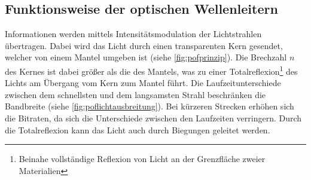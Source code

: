 \subsection{Funktionsweise der optischen Wellenleitern}
\label{subsec:poffunktionsweise}

Informationen werden mittels Intensitätsmodulation der Lichtstrahlen übertragen.
Dabei wird das Licht durch einen transparenten Kern gesendet, welcher von einem
Mantel umgeben ist (siehe \autoref{fig:pofprinzip}). Die Brechzahl $n$ des
Kernes ist dabei größer als die des Mantels, was zu einer
Totalreflexion\footnote{Beinahe vollständige Reflexion von Licht an der
Grenzfläche zweier Materialien} des Lichts am Übergang vom Kern zum Mantel
führt. Die Laufzeitunterschiede zwischen dem schnellsten und dem langsamsten
Strahl beschränken die Bandbreite (siehe \autoref{fig:poflichtausbreitung}). Bei
kürzeren Strecken erhöhen sich die Bitraten, da sich die Unterschiede zwischen
den Laufzeiten verringern. Durch die Totalreflexion kann das Licht auch durch
Biegungen geleitet werden. \cite{pofacprinzip}

